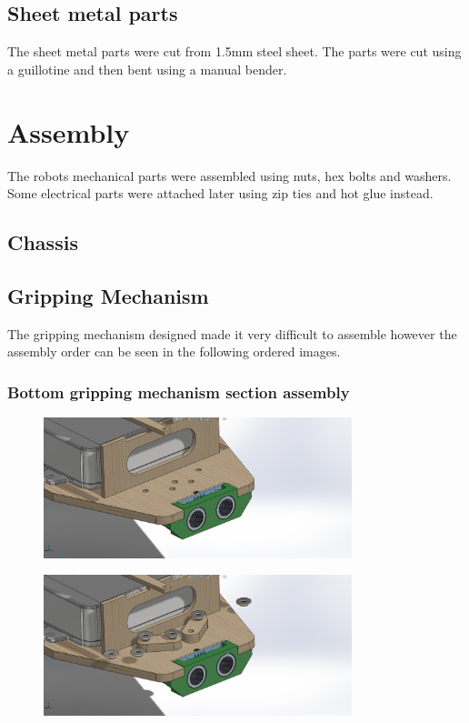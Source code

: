 \documentclass{article}
\begin{document}
\subsection{Sheet metal parts}
\quad The sheet metal parts were cut from 1.5mm steel sheet. The parts were cut using a guillotine and then bent using a manual bender.

\section{Assembly}
\quad The robots mechanical parts were assembled using nuts, hex bolts and washers. Some electrical parts were attached later using zip ties and hot glue instead.

\subsection {Chassis}

\subsection{Gripping Mechanism}
\quad The gripping mechanism designed made it very difficult to assemble however the assembly order can be seen in the following ordered images.

\subsubsection{Bottom gripping mechanism section assembly} 

\begin{figure}[H]
    \centering
    \includegraphics[width=0.8\textwidth]{assets/assembly/1.png}
\end{figure}

\begin{figure}[H]
    \centering
    \includegraphics[width=0.8\textwidth]{assets/assembly/2.png}
\end{figure}
\end{document}
